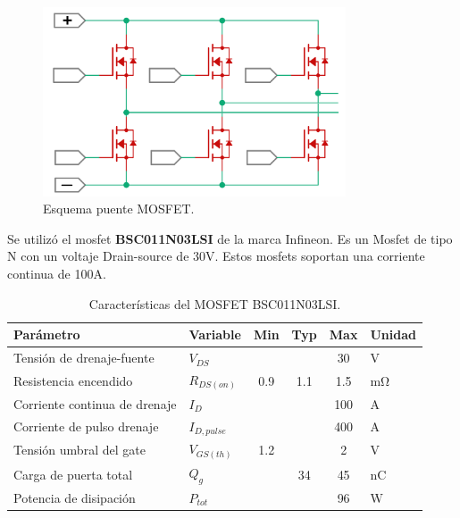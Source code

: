 \documentclass[11pt]{report}
\begin{document}
\begin{figure}[ht]
	\centering
	\includegraphics[width=0.8\textwidth]{imagenes/Diagramas/puente mosfet.png}
	\caption{Esquema puente MOSFET.}
	\label{puente_MOSFET}
\end{figure}
\FloatBarrier

Se utilizó el mosfet \textbf{BSC011N03LSI} de la marca Infineon. Es un Mosfet de tipo N con un voltaje Drain-source de 30V. Estos mosfets soportan una corriente continua de 100A.

\begin{table}[h!]
	\centering
	\caption{Características del MOSFET BSC011N03LSI.}
	\begin{tabular}{l l c c c l}
		\hline
		\textbf{Parámetro}            & \textbf{Variable} & \textbf{Min} & \textbf{Typ} & \textbf{Max} & \textbf{Unidad}    \\
		\hline
		Tensión de drenaje-fuente     & $V_{DS}$          &              &              & 30           & $\mathrm{V}$       \\
		Resistencia encendido         & $R_{DS(on)}$      & 0.9          & 1.1          & 1.5          & $\mathrm{m\Omega}$ \\
		Corriente continua de drenaje & $I_D$             &              &              & 100          & $\mathrm{A}$       \\
		Corriente de pulso drenaje    & $I_{D,pulse}$     &              &              & 400          & $\mathrm{A}$       \\
		Tensión umbral del gate       & $V_{GS(th)}$      & 1.2          &              & 2            & $\mathrm{V}$       \\
		Carga de puerta total         & $Q_g$             &              & 34           & 45           & $\mathrm{nC}$      \\
		Potencia de disipación        & $P_{tot}$         &              &              & 96           & $\mathrm{W}$       \\
		\hline
	\end{tabular}
\end{table}
\FloatBarrier
\end{document}
